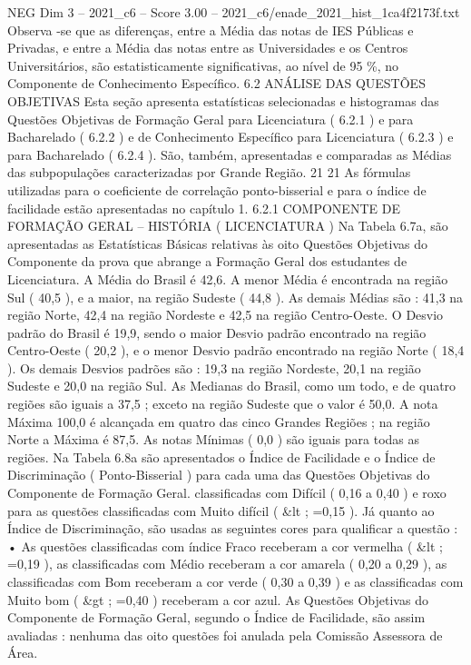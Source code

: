 \begin{textsample}{NEG Dim 3 – 2021\_c6 – Score 3.00 – 2021\_c6/enade\_2021\_hist\_1ca4f2173f.txt}
Observa -se que as diferenças, entre a Média das notas de IES Públicas e Privadas, e entre a Média das notas entre as Universidades e os Centros Universitários, são estatisticamente significativas, ao nível de 95 \%, no Componente de Conhecimento Específico. 6.2 ANÁLISE DAS QUESTÕES OBJETIVAS Esta seção apresenta estatísticas selecionadas e histogramas das Questões Objetivas de Formação Geral para Licenciatura ( 6.2.1 ) e para Bacharelado ( 6.2.2 ) e de Conhecimento Específico para Licenciatura ( 6.2.3 ) e para Bacharelado ( 6.2.4 ).
São, também, apresentadas e comparadas as Médias das subpopulações caracterizadas por Grande Região. 21 21 As fórmulas utilizadas para o coeficiente de correlação ponto-bisserial e para o índice de facilidade estão apresentadas no capítulo 1. 6.2.1 COMPONENTE DE FORMAÇÃO GERAL – HISTÓRIA ( LICENCIATURA ) Na Tabela 6.7a, são apresentadas as Estatísticas Básicas relativas às oito Questões Objetivas do Componente da prova que abrange a Formação Geral dos estudantes de Licenciatura.
A Média do Brasil é 42,6.
A menor Média é encontrada na região Sul ( 40,5 ), e a maior, na região Sudeste ( 44,8 ).
As demais Médias são : 41,3 na região Norte, 42,4 na região Nordeste e 42,5 na região Centro-Oeste.
O Desvio padrão do Brasil é 19,9, sendo o maior Desvio padrão encontrado na região Centro-Oeste ( 20,2 ), e o menor Desvio padrão encontrado na região Norte ( 18,4 ).
Os demais Desvios padrões são : 19,3 na região Nordeste, 20,1 na região Sudeste e 20,0 na região Sul.
As Medianas do Brasil, como um todo, e de quatro regiões são iguais a 37,5 ; exceto na região Sudeste que o valor é 50,0.
A nota Máxima 100,0 é alcançada em quatro das cinco Grandes Regiões ; na região Norte a Máxima é 87,5.
As notas Mínimas ( 0,0 ) são iguais para todas as regiões.
Na Tabela 6.8a são apresentados o Índice de Facilidade e o Índice de Discriminação ( Ponto-Bisserial ) para cada uma das Questões Objetivas do Componente de Formação Geral. classificadas com Difícil ( 0,16 a 0,40 ) e roxo para as questões classificadas com Muito difícil ( \&lt ; =0,15 ).
Já quanto ao Índice de Discriminação, são usadas as seguintes cores para qualificar a questão : • As questões classificadas com índice Fraco receberam a cor vermelha ( \&lt ; =0,19 ), as classificadas com Médio receberam a cor amarela ( 0,20 a 0,29 ), as classificadas com Bom receberam a cor verde ( 0,30 a 0,39 ) e as classificadas com Muito bom ( \&gt ; =0,40 ) receberam a cor azul.
As Questões Objetivas do Componente de Formação Geral, segundo o Índice de Facilidade, são assim avaliadas : nenhuma das oito questões foi anulada pela Comissão Assessora de Área.

\end{textsample}
